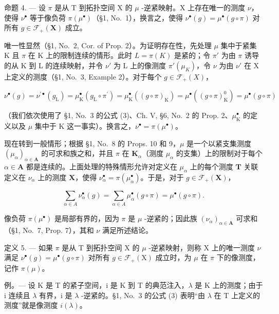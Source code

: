命题 4. --- 设 \(\pi\) 是从 T 到拓扑空间 X 的 \(\mu\) -逆紧映射。X 上存在唯一的测度 \(\nu\)，使得 \(\nu^{\bullet}\) 等于像负荷 \(\pi(\mu^{\bullet})\)（§1, No.~1），换言之，使得 \(\nu^{\bullet}(g) = \mu^{\bullet}(g \circ \pi)\) 对所有 \(g \in \mathcal{F}_{+}(\mathbf{X})\) 成立。

唯一性显然（§1, No.~2, Cor. of Prop. 2）。为证明存在性，先处理 \(\mu\) 集中于紧集 K 且 \(\pi\) 在 K 上的限制连续的情形。此时 \(L = \pi(K)\) 是紧的；令 \(\pi'\) 为由 \(\pi\) 诱导的从 K 到 L 的连续映射，并令 \(\nu'\) 为 L 上的像测度 \(\pi'(\mu_K)\)，令 \(\nu\) 为由 \(\nu'\) 在 X 上定义的测度（§1, No.~3, Example 2）。对于每个 \(g \in \mathcal{F}_+(X)\)，

\[
\nu^ {\bullet} (g) = \nu^ {\prime \bullet} (g _ {\mathrm{L}}) = \mu_ {\mathrm{K}} ^ {\bullet} (g _ {\mathrm{L}} \circ \pi^ {\prime}) = \mu_ {\mathrm{K}} ^ {\bullet} ((g \circ \pi) _ {\mathrm{K}}) = \mu^ {\bullet} ((g \circ \pi) _ {\mathrm{K}} ^ {0}) = \mu^ {\bullet} (g \circ \pi)
\]

（我们依次使用了 §1, No.~3 的公式 (3)、Ch. V, §6, No.~2 的 Prop. 2、\(\mu_{\mathrm{K}}^{\bullet}\) 的定义以及 \(\mu\) 集中于 K 这一事实）。换言之，\(\nu^{\bullet} = \pi(\mu^{\bullet})\)。

现在转到一般情形；根据 §1, No.~8 的 Props. 10 和 9，\(\mu\) 是一个以紧支集测度 \((\mu_{\alpha})_{\alpha \in \mathbf{A}}\) 的可求和族之和，并且 \(\pi\) 在 \(\mathbf{K}_{\alpha}\)（测度 \(\mu_{\alpha}\) 的支集）上的限制对于每个 \(\alpha \in \mathbf{A}\) 都是连续的。上面处理的特殊情形允许对定义在 \(\mu_{\alpha}\) 上的每个测度 \(\mathbf{T}\) 关联定义在 \(\nu_{\alpha}\) 上的测度 \(\mathbf{X}\)，使得 \(\nu_{\alpha}^{\bullet} = \pi (\mu_{\alpha}^{\bullet})\)。于是，对于 \(g \in \mathcal{F}_{+}(\mathbf{X})\)，

\[
\sum_ {\alpha \in A} \nu_ {\alpha} ^ {\bullet} (g) = \sum_ {\alpha \in A} \mu_ {\alpha} ^ {\bullet} (g \circ \pi) = \mu^ {\bullet} (g \circ \pi).
\]

像负荷 \(\pi (\mu^{\bullet})\) 是局部有界的，因为 \(\pi\) 是 \(\mu\) -逆紧的；因此族 \((\nu_{\alpha})_{\alpha \in \mathbf{A}}\) 可求和（§1, No.~7, Prop. 7），其和 \(\nu\) 满足所述结论。

定义 5. --- 如果 \(\pi\) 是从 T 到拓扑空间 X 的 \(\mu\) -逆紧映射，则称 X 上的唯一测度 \(\nu\) 满足 \(\nu^{\bullet}(g) = \mu^{\bullet}(g \circ \pi)\) 对所有 \(g \in \mathcal{F}_{+}(\mathrm{X})\) 成立时，为 \(\mu\) 在 \(\pi\) 下的像测度，记作 \(\pi(\mu)\)。

例。--- 设 K 是 T 的紧子空间，i 是 K 到 T 的典范注入，\(\lambda\) 是 K 上的测度；由于 i 连续且 \(\lambda\) 有界，i 是 \(\lambda\) -逆紧的。§1, No.~3 的公式 (3) 表明“由 \(\lambda\) 在 T 上定义的测度”就是像测度 \(i(\lambda)\)。

